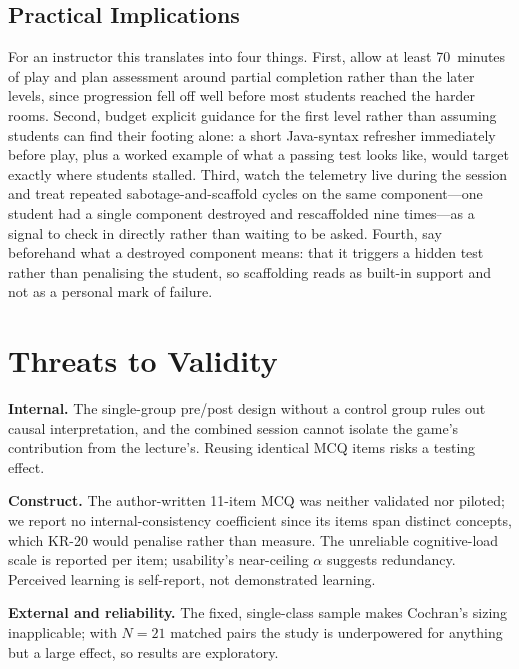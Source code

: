\documentclass[conference]{IEEEtran}
\begin{document}
\subsection{Practical Implications}

For an instructor this translates into four things. First, allow at least 70~minutes of play and plan assessment around partial completion rather than the later levels, since progression fell off well before most students reached the harder rooms. Second, budget explicit guidance for the first level rather than assuming students can find their footing alone: a short Java-syntax refresher immediately before play, plus a worked example of what a passing test looks like, would target exactly where students stalled. Third, watch the telemetry live during the session and treat repeated sabotage-and-scaffold cycles on the same component---one student had a single component destroyed and rescaffolded nine times---as a signal to check in directly rather than waiting to be asked. Fourth, say beforehand what a destroyed component means: that it triggers a hidden test rather than penalising the student, so scaffolding reads as built-in support and not as a personal mark of failure.

\section{Threats to Validity}
\label{sec:threats}

\textbf{Internal.} The single-group pre/post design without a control group rules out causal interpretation, and the combined session cannot isolate the game's contribution from the lecture's. Reusing identical MCQ items risks a testing effect.

\textbf{Construct.} The author-written 11-item MCQ was neither validated nor piloted; we report no internal-consistency coefficient since its items span distinct concepts, which KR-20 would penalise rather than measure. The unreliable cognitive-load scale is reported per item; usability's near-ceiling $\alpha$ suggests redundancy. Perceived learning is self-report, not demonstrated learning.

\textbf{External and reliability.} The fixed, single-class sample makes Cochran's sizing inapplicable; with $N = 21$ matched pairs the study is underpowered for anything but a large effect, so results are exploratory.
\end{document}
